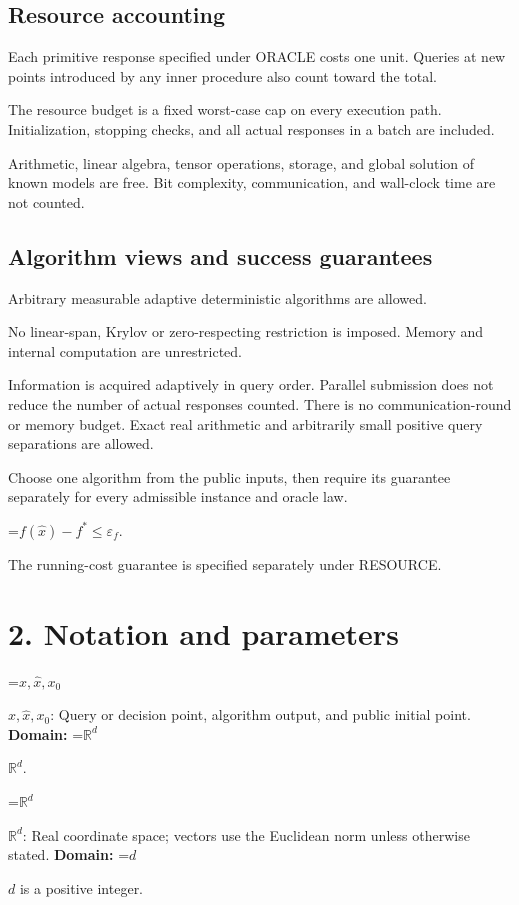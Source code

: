 \documentclass[10pt,a4paper]{article}
\newcommand{\AtlasMath}[1]{\par\begingroup\centering\setbox0=\hbox{$\displaystyle #1$}\ifdim\wd0>1.4\linewidth\typeout{ATLAS WIDE FORMULA: \the\wd0}\fi\ifdim\wd0>\linewidth\resizebox{\linewidth}{!}{\box0}\else\box0\fi\par\endgroup}
\newcommand{\AtlasInlineMath}[1]{\begingroup\setbox0=\hbox{$#1$}\ifdim\wd0>.4\linewidth\endgroup\AtlasMath{#1}\else\endgroup$#1$\fi}
\begin{document}
\subsection{Resource accounting}
Each primitive response specified under ORACLE costs one unit. Queries at new points introduced by any inner procedure also count toward the total.

The resource budget is a fixed worst-case cap on every execution path. Initialization, stopping checks, and all actual responses in a batch are included.

Arithmetic, linear algebra, tensor operations, storage, and global solution of known models are free. Bit complexity, communication, and wall-clock time are not counted.

\subsection{Algorithm views and success guarantees}
Arbitrary measurable adaptive deterministic algorithms are allowed.

No linear-span, Krylov or zero-respecting restriction is imposed. Memory and internal computation are unrestricted.

Information is acquired adaptively in query order. Parallel submission does not reduce the number of actual responses counted. There is no communication-round or memory budget. Exact real arithmetic and arbitrarily small positive query separations are allowed.

Choose one algorithm from the public inputs, then require its guarantee separately for every admissible instance and oracle law.


\AtlasMath{f(\widehat{x})-f^*\le \varepsilon_f.}


The running-cost guarantee is specified separately under RESOURCE.

\section{2. Notation and parameters}
\AtlasInlineMath{x,\widehat{x},x_0}: Query or decision point, algorithm output, and public initial point. \textbf{Domain:} \AtlasInlineMath{\mathbb{R}^d}.

\AtlasInlineMath{\mathbb{R}^d}: Real coordinate space; vectors use the Euclidean norm unless otherwise stated. \textbf{Domain:} \AtlasInlineMath{d} is a positive integer.
\end{document}
